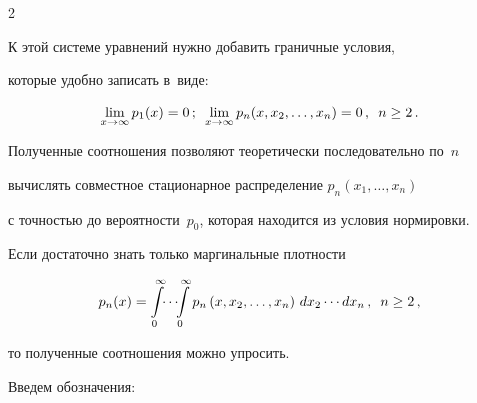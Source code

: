 \begin{multicols}{2}
\noindent


К этой системе уравнений нужно добавить граничные условия,


которые удобно записать в~виде:


\begin{equation*}




\lim\limits_{x\to \infty} p_{1}(x) = 0\,;                         %


\enskip




\lim\limits_{x\to \infty} p_{n}(x,x_2,\ld,x_n) =


0\,,\enskip n\ge 2\,.               %


\end{equation*}





\noindent


Полученные соотношения позволяют теоретически последовательно по~$n$


вычислять совместное стационарное распределение $p_n(x_1,\ldots,x_{n})$


с точностью до вероятности~$p_0$, которая находится из условия нормировки.


Если достаточно знать только маргинальные плотности





\vspace*{2pt}





\noindent


\begin{equation*}


p_n(x) = \int\limits_0^\infty\!\! \cdots\!\! \int\limits_0^\infty


p_n\left(x,x_2,\ld,x_n\right)\, dx_2\cdots dx_n\,,


\enskip n\ge 2\,,


\end{equation*}





\noindent то полученные соотношения можно упросить.


Введем обозначения:





\vspace*{-2pt}






\end{multicols}
